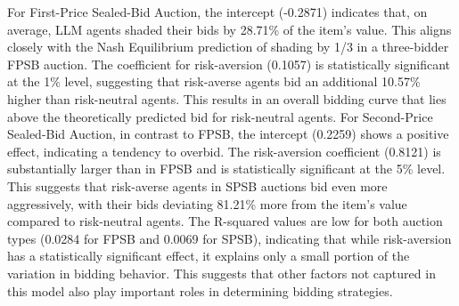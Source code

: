 \documentclass{article} %
\begin{document}
For First-Price Sealed-Bid Auction, the intercept (-0.2871) indicates that, on average, LLM agents shaded their bids by 28.71\% of the item's value. 
This aligns closely with the Nash Equilibrium prediction of shading by 1/3 in a three-bidder FPSB auction. 
The coefficient for risk-aversion (0.1057) is statistically significant at the 1\% level, suggesting that risk-averse agents bid an additional 10.57\% higher than risk-neutral agents. 
This results in an overall bidding curve that lies above the theoretically predicted bid for risk-neutral agents.
For Second-Price Sealed-Bid Auction, in contrast to FPSB, the intercept (0.2259) shows a positive effect, indicating a tendency to overbid. 
The risk-aversion coefficient (0.8121) is substantially larger than in FPSB and is statistically significant at the 5\% level. 
This suggests that risk-averse agents in SPSB auctions bid even more aggressively, with their bids deviating 81.21\% more from the item's value compared to risk-neutral agents.
The R-squared values are low for both auction types (0.0284 for FPSB and 0.0069 for SPSB), indicating that while risk-aversion has a statistically significant effect, it explains only a small portion of the variation in bidding behavior. 
This suggests that other factors not captured in this model also play important roles in determining bidding strategies.
\end{document}
